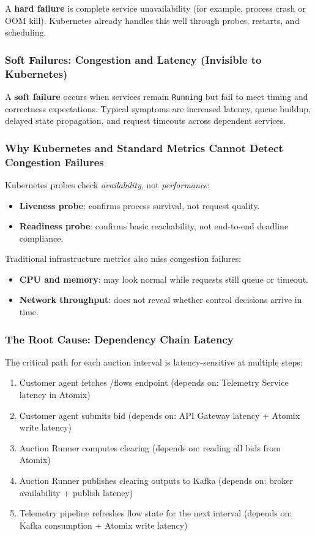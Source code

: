 A \textbf{hard failure} is complete service unavailability (for example, process crash or OOM kill). Kubernetes already handles this well through probes, restarts, and scheduling.

\subsubsection{Soft Failures: Congestion and Latency (Invisible to Kubernetes)}

A \textbf{soft failure} occurs when services remain \texttt{Running} but fail to meet timing and correctness expectations. Typical symptoms are increased latency, queue buildup, delayed state propagation, and request timeouts across dependent services.

\subsubsection{Why Kubernetes and Standard Metrics Cannot Detect Congestion Failures}

Kubernetes probes check \textit{availability}, not \textit{performance}:

\begin{itemize}
    \item \textbf{Liveness probe}: confirms process survival, not request quality.
    \item \textbf{Readiness probe}: confirms basic reachability, not end-to-end deadline compliance.
\end{itemize}

Traditional infrastructure metrics also miss congestion failures:

\begin{itemize}
    \item \textbf{CPU and memory}: may look normal while requests still queue or timeout.
    \item \textbf{Network throughput}: does not reveal whether control decisions arrive in time.
\end{itemize}

\subsubsection{The Root Cause: Dependency Chain Latency}

The critical path for each auction interval is latency-sensitive at multiple steps:

\begin{enumerate}
    \item Customer agent fetches /flows endpoint (depends on: Telemetry Service latency in Atomix)
    \item Customer agent submits bid (depends on: API Gateway latency + Atomix write latency)
    \item Auction Runner computes clearing (depends on: reading all bids from Atomix)
    \item Auction Runner publishes clearing outputs to Kafka (depends on: broker availability + publish latency)
    \item Telemetry pipeline refreshes flow state for the next interval (depends on: Kafka consumption + Atomix write latency)
\end{enumerate}

